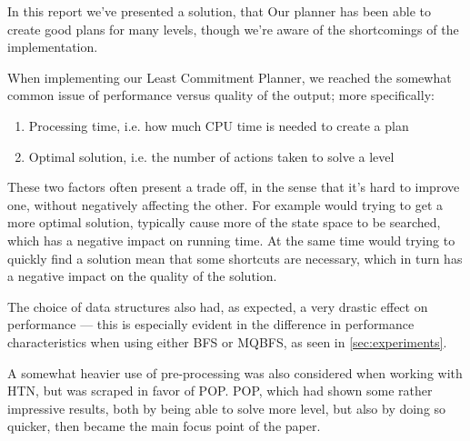 \documentclass[Main]{subfiles}
\begin{document}
In this report we've presented a solution, that 
Our planner has been able to create good plans for many levels, though we're aware of the shortcomings of the implementation.




When implementing our Least Commitment Planner, we reached the somewhat common issue of performance versus quality of the output; more specifically:

\begin{enumerate}
	\item Processing time, i.e. how much CPU time is needed to create a plan
	\item Optimal solution, i.e. the number of actions taken to solve a level
\end{enumerate}

These two factors often present a trade off, in the sense that it's hard to improve one, without negatively affecting the other. 
For example would trying to get a more optimal solution, typically cause more of the state space to be searched, which has a negative impact on running time.
At the same time would trying to quickly find a solution mean that some shortcuts are necessary, which in turn has a negative impact on the quality of the solution.

The choice of data structures also had, as expected, a very drastic effect on performance ---
this is especially evident in the difference in performance characteristics when using either BFS or MQBFS, as seen in \autoref{sec:experiments}.

A somewhat heavier use of pre-processing was also considered when working with HTN, but was scraped in favor of POP. 
POP, which had shown some rather impressive results, both by being able to solve more level, but also by doing so quicker, then became the main focus point of the paper.
\end{document}
